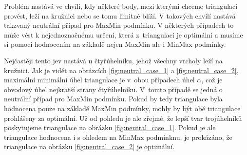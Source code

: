 \documentclass[12pt,a4paper]{article}
\begin{document}
{Problém nastává ve chvíli, kdy některé body, mezi kterými chceme
triangulaci provést, leží na kružnici nebo se tomu limitně blíží. V
takových chvílí nastává takzvaný neutrální případ pro MaxMin
podmínku. V některých případech to může vést k nejednoznačnému určení,
která z~triangulací je optimální a musíme si pomoci hodnocením na
základě nejen MaxMin ale i MinMax podmínky.

\begin{figure}[h!]
\centering
\begin{floatrow}
\end{floatrow}
\end{figure}


Nejčastěji tento jev nastává u čtyřúhelníku, jehož všechny vrcholy
leží na kružnici. Jak je vidět na obrázcích \ref{fig:neutral_case_1} a
\ref{fig:neutral_case_2}, maximální minimální úhel triangulace je
v~obou případech úhel $\alpha$, což je obvodový úhel nejkratší strany
čtyřúhelníku. V~tomto případě se jedná o neutrální případ pro MaxMin
podmínku. Pokud by tedy triangulace byla hodnocena pouze na základě
MaxMin podmínky, mohly by být obě triangulace prohlášeny za
optimální. Už od pohledu je ale zřejmé, že lepší tvar trojúhelníků
poskytujeme triangulace na obrázku \ref{fig:neutral_case_1}. Pokud je
ale triangulace hodnocena i s ohledem na MinMax podmínknu, je
prokázáno, že triangulace na obrázku \ref{fig:neutral_case_2} je
optimální.


}
\end{document}
